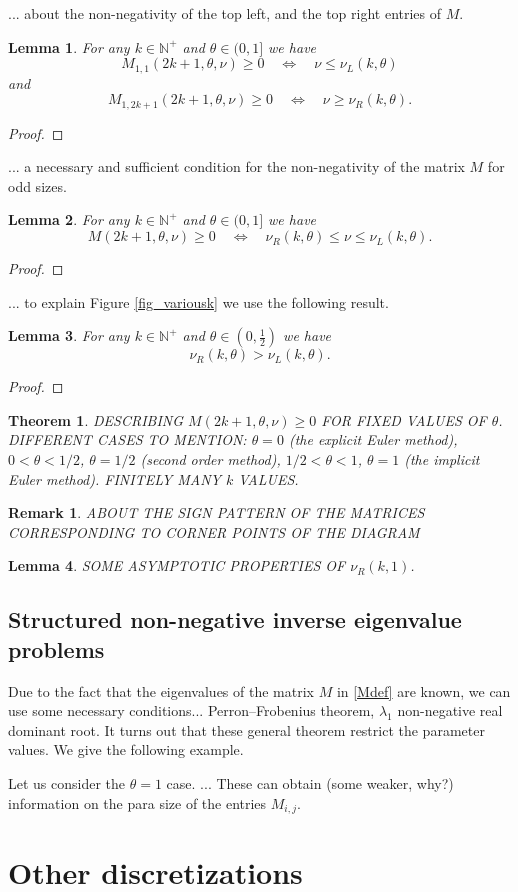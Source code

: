 \documentclass[a4paper]{article}
\newtheorem{theorem}{Theorem}
\newtheorem{lemma}{Lemma}
\newtheorem{remark}{Remark}
\newcommand{\te}{\theta}
\newcommand{\nul}{\nu_L(k,\theta)}
\newcommand{\nur}{\nu_R(k,\theta)}
\newcommand{\nplus}{\mathbb{N}^+}
\begin{document}
... about the non-negativity of the top left, and the top right entries of $M$.
\begin{lemma}
For any $k\in\nplus$ and $\te\in(0,1]$ we have 
\[
M_{1,1}(2k+1,\te,\nu)\ge 0 \quad \Longleftrightarrow \quad \nu\le\nul
\] 
and
\[
M_{1,2k+1}(2k+1,\te,\nu)\ge 0 \quad \Longleftrightarrow \quad \nu\ge\nur.
\] 
\end{lemma}
\begin{proof}
\end{proof}



... a necessary and sufficient condition for the non-negativity of the matrix $M$ for odd sizes.
\begin{lemma}
For any $k\in\nplus$ and $\te\in(0,1]$ we have 
\[
M(2k+1,\te,\nu)\ge 0 \quad \Longleftrightarrow \quad \nur\le\nu\le\nul.
\] 
\end{lemma}
\begin{proof}
\end{proof}


... to explain Figure \ref{fig_variousk} we use the following result.
\begin{lemma}
For any $k\in\nplus$ and $\te\in\left(0,\frac{1}{2}\right)$ we have 
\[
 \nur>\nul.
\] 
\end{lemma}
\begin{proof}
\end{proof}

\begin{theorem}
DESCRIBING $M(2k+1,\te,\nu)\ge 0 $ FOR FIXED VALUES OF $\te$.
DIFFERENT CASES TO MENTION:
$\te=0$ (the explicit Euler method), $0<\te<1/2$, $\te=1/2$ (second order method), $1/2<\te<1$, $\te=1$ (the implicit Euler method). FINITELY MANY $k$ VALUES.
\end{theorem}

\begin{remark}
ABOUT THE SIGN PATTERN OF THE MATRICES CORRESPONDING TO CORNER POINTS OF THE DIAGRAM
\end{remark}


\begin{lemma}
SOME ASYMPTOTIC PROPERTIES OF $\nu_R(k,1)$.
\end{lemma}



\subsection{Structured non-negative inverse eigenvalue problems}

Due to the fact that the eigenvalues of the matrix $M$ in \eqref{Mdef} are known, we can use some necessary conditions... Perron--Frobenius theorem, $\lambda_1$ non-negative real dominant root. 
It turns out that these general theorem restrict the parameter values. We give the following example.

Let us consider the $\te=1$ case. ...
These  can obtain (some weaker, why?) information on the para size of the entries $M_{i,j}$.

\section{Other discretizations}
\end{document}
